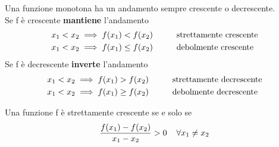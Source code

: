 \documentclass{article}
\begin{document}
Una funzione monotona ha un andamento sempre crescente o decrescente. \\
Se f è crescente \textbf{mantiene} l'andamento
\begin{align*}
    x_1 < x_2 &\implies f(x_1) < f(x_2) \hspace{1cm} \text{strettamente crescente} \\
    x_1 < x_2 &\implies f(x_1) \leq f(x_2) \hspace{1cm} \text{debolmente crescente} \\
\end{align*}
Se f è decrescente \textbf{inverte} l'andamento
\begin{align*}
    x_1 < x_2 &\implies f(x_1) > f(x_2) \hspace{1cm} \text{strettamente decrescente} \\
    x_1 < x_2 &\implies f(x_1) \geq f(x_2) \hspace{1cm} \text{debolmente decrescente} \\
\end{align*}

Una funzione f è strettamente crescente se e solo se
\[\frac{f(x_1) - f(x_2)}{x_1 - x_2} > 0 \hspace{.4cm} \forall x_1 \neq x_2\]
\end{document}
